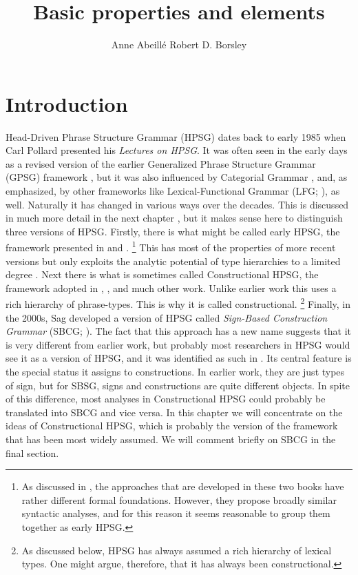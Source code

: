 \documentclass[output=paper
	        ,collection
	        ,collectionchapter
 	        ,biblatex
                ,babelshorthands
                ,newtxmath
                ,draftmode
                ,colorlinks, citecolor=brown
]{langscibook}
\title{Basic properties and elements}
\author{%
 Anne Abeillé\affiliation{Université Paris Diderot}%
 \lastand Robert D. Borsley\affiliation{University of Essex}%
}
\begin{document}
\maketitle
\label{chapter-basic-properties}\label{chap-properties}


\section{Introduction}\label{sec:prop1}
\label{prop:sec-intro}

Head-Driven Phrase Structure Grammar (HPSG) dates back to early 1985 when Carl Pollard presented his \emph{Lectures on HPSG}. It was often seen in the early days as a revised version of the earlier Generalized Phrase Structure Grammar (GPSG) framework \citep*{GKPS85a}, but it was also influenced by Categorial Grammar \citep{Ajdukiewicz35a-u,Steedman2000a-u}, and, as \citet[1]{ps} emphasized, by other frameworks like Lexical-Functional Grammar (LFG; \citealt{Bresnan82a-ed}), as well. Naturally it has changed in various ways over the decades. This is discussed in much more detail in the next chapter , but it makes sense here to distinguish three versions of HPSG. Firstly, there is what might be called early HPSG, the framework presented in \citet{ps} and \citet{ps2}.%
%
\footnote{As discussed in , the approaches that are developed in these two books have rather different formal foundations. However, they propose broadly similar syntactic analyses, and for this reason it seems reasonable to group them together as early HPSG.}
%
This has most of the properties of more recent versions but only exploits the analytic potential of type hierarchies to a limited degree \citep*{Flickinger87,FPW85a}. Next there is what is sometimes called Constructional HPSG, the framework adopted in , , and much other work. Unlike earlier work this uses a rich hierarchy of phrase-types. This is why it is called constructional.%
%
\footnote{As discussed below, HPSG has always assumed a rich hierarchy of lexical types. One might argue, therefore, that it has always been constructional.}
%
Finally, in the 2000s, Sag developed a version of HPSG called \emph{Sign-Based Construction Grammar} (SBCG; \citealt{Sag2012a}). The fact that this approach has a new name suggests that it is very different from earlier work, but probably most researchers in HPSG would see it as a version of HPSG, and it was identified as such in \citet[486]{Sag2010b}. Its central feature is the special status it assigns to constructions. In earlier work, they are just types of sign, but for SBSG, signs and constructions are quite different objects. In spite of this difference, most analyses in Constructional HPSG could probably be translated into SBCG and vice versa. In this chapter we will concentrate on the ideas of Constructional HPSG, which is probably the version of the framework that has been most widely assumed. We will comment briefly on SBCG in the final section.
\end{document}
